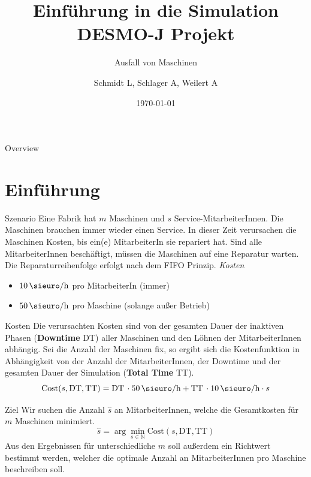 \documentclass{beamer}
\title{Einführung in die Simulation\\DESMO-J Projekt}
\subtitle{Ausfall von Maschinen}
\author{Schmidt L, Schlager A, Weilert A}
\institute{Paris Lodron Universität Salzburg}
\date{\today}
\begin{document}
    \maketitle

    \begin{frame}{Overview}
        \tableofcontents
    \end{frame}



    \section{Einführung}
    \begin{frame}{Szenario}
        Eine Fabrik hat $m$ Maschinen und $s$ Service-MitarbeiterInnen.
        Die Maschinen brauchen immer wieder einen Service.
        In dieser Zeit verursachen die Maschinen Kosten, bis ein(e) MitarbeiterIn sie repariert hat.
        Sind alle MitarbeiterInnen beschäftigt,
        müssen die Maschinen auf eine Reparatur warten.
        Die Reparaturreihenfolge erfolgt nach dem FIFO Prinzip.\vspace*{1em}\newline
        \textit{Kosten}
        \begin{itemize}
            \item $\SI{10}{\sieuro\per\hour}$ pro MitarbeiterIn (immer)
            \item $\SI{50}{\sieuro\per\hour}$ pro Maschine (solange außer Betrieb)
        \end{itemize}
    \end{frame}

    \begin{frame}{Kosten}
        Die verursachten Kosten sind von der gesamten Dauer der inaktiven Phasen (\textbf{Downtime} DT) aller Maschinen und den
        Löhnen der MitarbeiterInnen abhängig.
        Sei die Anzahl der Maschinen fix, so ergibt sich die Kostenfunktion in Abhängigkeit von der Anzahl der MitarbeiterInnen,
        der Downtime und der gesamten Dauer der Simulation (\textbf{Total Time} TT).
        \[
            \mathrm{Cost}(s, \text{DT}, \text{TT}) = \text{DT}\,\cdot \SI{50}{\sieuro\per\hour} + \text{TT}\,\cdot \SI{10}{\sieuro\per\hour} \cdot s
        \]
    \end{frame}

    \begin{frame}{Ziel}
        Wir suchen die Anzahl $\hat{s}$ an MitarbeiterInnen, welche die Gesamtkosten für $m$ Maschinen minimiert.
        \[
            \hat{s} = \arg\min_{s \in \mathbb{N}} \mathrm{Cost}(s, \text{DT}, \text{TT})
        \]
        Aus den Ergebnissen für unterschiedliche $m$ soll außerdem ein Richtwert bestimmt werden, welcher
        die optimale Anzahl an MitarbeiterInnen pro Maschine beschreiben soll.
    \end{frame}
\end{document}
